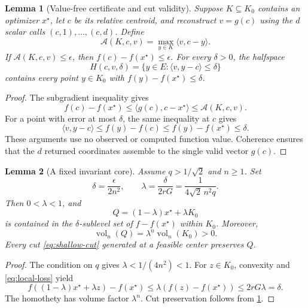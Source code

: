 \documentclass[11pt]{article}
\numberwithin{equation}{section}
\newtheorem{lemma}[lemma]{Lemma}
\theoremstyle{definition}
\theoremstyle{remark}
\newcommand{\eps}{\epsilon}
\DeclareMathOperator{\vol}{vol}
\newcommand{\ip}[2]{\langle #1,#2\rangle}
\begin{document}
\begin{lemma}[Value-free certificate and cut validity]\label{lem:certificate}
Suppose $K\subseteq K_0$ contains an optimizer $x^\star$, let $c$ be its relative centroid, and reconstruct $v=g(c)$ using the $d$ scalar calls $(c,1),\ldots,(c,d)$. Define
\begin{equation}\label{eq:certificate}
\mathcal A(K,c,v)=\max_{y\in K}\ip{v}{c-y}.
\end{equation}
If $\mathcal A(K,c,v)\le\eps$, then $f(c)-f(x^\star)\le\eps$. For every $\delta>0$, the halfspace
\begin{equation}\label{eq:shallow-cut}
H(c,v,\delta)=\{y\in E:\ip{v}{y-c}\le\delta\}
\end{equation}
contains every point $y\in K_0$ with $f(y)-f(x^\star)\le\delta$.
\end{lemma}
\begin{proof}
The subgradient inequality gives
\[
f(c)-f(x^\star)\le\ip{g(c)}{c-x^\star}\le\mathcal A(K,c,v).
\]
For a point with error at most $\delta$, the same inequality at $c$ gives
\[
\ip{v}{y-c}\le f(y)-f(c)\le f(y)-f(x^\star)\le\delta.
\]
These arguments use no observed or computed function value. Coherence ensures that the $d$ returned coordinates assemble to the single valid vector $g(c)$.
\end{proof}

\begin{lemma}[A fixed invariant core]\label{lem:core}
Assume $q>1/\sqrt2$ and $n\ge1$. Set
\begin{equation}\label{eq:core-parameters}
\delta=\frac\eps{2n^2},\qquad
\lambda=\frac\delta{2rG}=\frac1{4\sqrt2\,n^2q}.
\end{equation}
Then $0<\lambda<1$, and
\begin{equation}\label{eq:invariant-core}
Q=(1-\lambda)x^\star+\lambda K_0
\end{equation}
is contained in the $\delta$-sublevel set of $f-f(x^\star)$ within $K_0$. Moreover,
\begin{equation}\label{eq:core-volume}
\vol_n(Q)=\lambda^n\vol_n(K_0)>0.
\end{equation}
Every cut \eqref{eq:shallow-cut} generated at a feasible center preserves $Q$.
\end{lemma}
\begin{proof}
The condition on $q$ gives $\lambda<1/(4n^2)<1$. For $z\in K_0$, convexity and \eqref{eq:local-loss} yield
\[
f((1-\lambda)x^\star+\lambda z)-f(x^\star)
\le\lambda(f(z)-f(x^\star))\le2rG\lambda=\delta.
\]
The homothety has volume factor $\lambda^n$. Cut preservation follows from \cref{lem:certificate}.
\end{proof}
\end{document}
